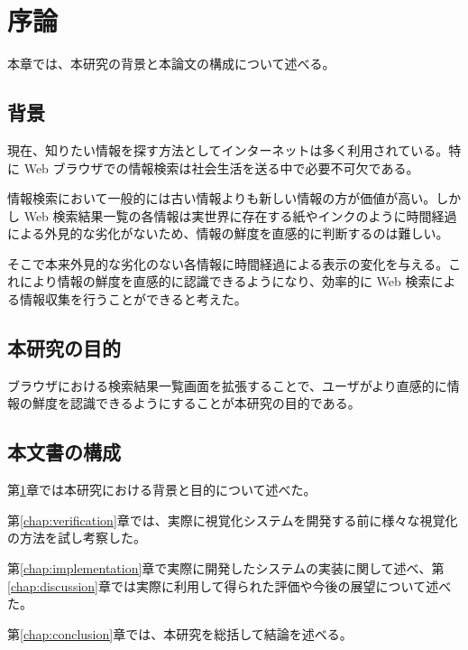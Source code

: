\chapter{序論}
\label{chap:introduction}

本章では、本研究の背景と本論文の構成について述べる。

\newpage

\section{背景}

現在、知りたい情報を探す方法としてインターネットは多く利用されている。特に Web ブラウザでの情報検索は社会生活を送る中で必要不可欠である。

情報検索において一般的には古い情報よりも新しい情報の方が価値が高い。しかし Web 検索結果一覧の各情報は実世界に存在する紙やインクのように時間経過による外見的な劣化がないため、情報の鮮度を直感的に判断するのは難しい。

そこで本来外見的な劣化のない各情報に時間経過による表示の変化を与える。これにより情報の鮮度を直感的に認識できるようになり、効率的に Web 検索による情報収集を行うことができると考えた。

\section{本研究の目的}

ブラウザにおける検索結果一覧画面を拡張することで、ユーザがより直感的に情報の鮮度を認識できるようにすることが本研究の目的である。

\section{本文書の構成}

第\ref{chap:introduction}章では本研究における背景と目的について述べた。

第\ref{chap:verification}章では、実際に視覚化システムを開発する前に様々な視覚化の方法を試し考察した。

第\ref{chap:implementation}章で実際に開発したシステムの実装に関して述べ、第\ref{chap:discussion}章では実際に利用して得られた評価や今後の展望について述べた。

第\ref{chap:conclusion}章では、本研究を総括して結論を述べる。
